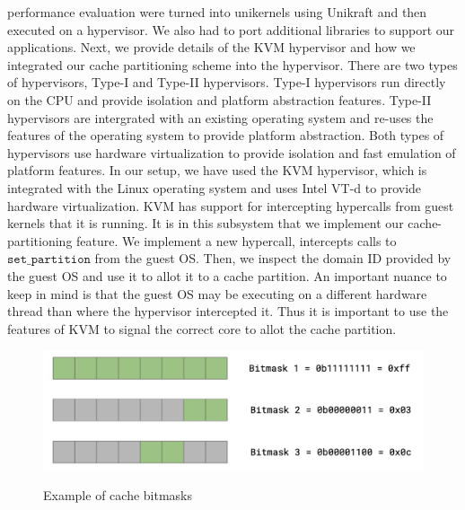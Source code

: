\documentclass[sigconf,authorversion,noacm]{acmart}
\begin{document}
performance evaluation were turned into unikernels using Unikraft and then
executed on a hypervisor. We also had to port additional libraries to support
our applications. Next, we provide details of the KVM hypervisor and how we
integrated our cache partitioning scheme into the hypervisor. There are two
types of hypervisors, Type-I and Type-II hypervisors. Type-I hypervisors run
directly on the CPU and provide isolation and platform abstraction features.
Type-II hypervisors are intergrated with an existing operating system and
re-uses the features of the operating system to provide platform abstraction.
Both types of hypervisors use hardware virtualization to provide isolation and
fast emulation of platform features. In our setup, we have used the KVM
hypervisor, which is integrated with the Linux operating system and uses Intel
VT-d to provide hardware virtualization. KVM has support for intercepting
hypercalls from guest kernels that it is running. It is in this subsystem that
we implement our cache-partitioning feature. We implement a new hypercall,
intercepts calls to $\texttt{set\_partition}$ from the guest OS. Then, we
inspect the domain ID provided by the guest OS and use it to allot it to a cache
partition. An important nuance to keep in mind is that the guest OS may be
executing on a different hardware thread than where the hypervisor intercepted
it. Thus it is important to use the features of KVM to signal the correct core
to allot the cache partition.

\begin{figure}[h]
  \centering
  \includegraphics[width=\linewidth]{bitmasks}
    \label{fig:bitmasks}
    \caption{Example of cache bitmasks}
\end{figure}
\end{document}
